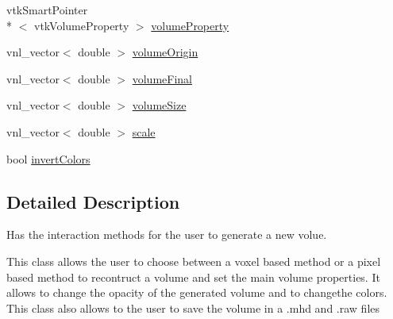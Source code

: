 \begin{DoxyCompactItemize}
\item 
vtk\-Smart\-Pointer\\*
$<$ vtk\-Volume\-Property $>$ \hyperlink{class_volume_reconstruction_widget_aa019933b9a5cdfee94739d13b383b7b8}{volume\-Property}
\item 
vnl\-\_\-vector$<$ double $>$ \hyperlink{class_volume_reconstruction_widget_a8a96c61c0e699daeaa349bc94610863b}{volume\-Origin}
\item 
vnl\-\_\-vector$<$ double $>$ \hyperlink{class_volume_reconstruction_widget_abb6e7b4895b0a9e6b60419b432b9afcb}{volume\-Final}
\item 
vnl\-\_\-vector$<$ double $>$ \hyperlink{class_volume_reconstruction_widget_ac6e459db730b1349685d3d01e95692bd}{volume\-Size}
\item 
vnl\-\_\-vector$<$ double $>$ \hyperlink{class_volume_reconstruction_widget_ae236e766bdd26a8e1d3af5abc965b558}{scale}
\item 
bool \hyperlink{class_volume_reconstruction_widget_a5c6d9354261c5494fab5d408da9ec13f}{invert\-Colors}
\end{DoxyCompactItemize}


\subsection{Detailed Description}
Has the interaction methods for the user to generate a new volue. 

This class allows the user to choose between a voxel based method or a pixel based method to recontruct a volume and set the main volume properties. It allows to change the opacity of the generated volume and to changethe colors. This class also allows to the user to save the volume in a .mhd and .raw files 

